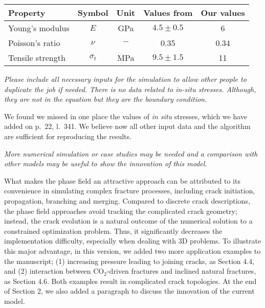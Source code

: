 \documentclass{elsarticle}
\newcommand{\review}[1]{ \textit{#1}}
\begin{document}
{\begin{table}[htbp]
	\begin{tabular}{l c c c c}
		\hline 
		Property & Symbol & Unit & Values from \cite{eseme2007review} & Our values\\
		\hline
		Young's modulus & $E$ & GPa & $4.5\pm0.5$ & 6\\
		Poisson's ratio & $\nu$ & $-$ & 0.35 & 0.34\\
		Tensile strength & $\sigma_t$ & MPa & $9.5\pm1.5$ & 11\\
		\hline
	\end{tabular}
	\label{Tab:input_data}
\end{table}


    \review{Please include all necessary inputs for the simulation to allow other people to duplicate the job if needed.
    There is no data related to in-situ stresses. Although, they are not in the equation but they are the boundary condition.}

{We found we missed in one place the values of \textit{in situ} stresses, which we have added on p.~22, l.~341. We believe now all other input data and the algorithm are sufficient for reproducing the results.}

\bigskip

    \review{More numerical simulation or case studies may be needed and a comparison with other models may be useful to show the innovation of this model.}

{What makes the phase field an attractive approach can be attributed to its convenience in simulating complex fracture processes, including crack initiation, propagation, branching and merging. Compared to discrete crack descriptions, the phase field approaches avoid tracking the complicated crack geometry; instead, the crack evolution is a natural outcome of the numerical solution to a constrained optimization problem. Thus, it significantly decreases the implementation difficulty, especially when dealing with 3D problems. To illustrate this major advantage, in this version, we added two more application examples to the manuscript; (1) increasing pressure leading to joining cracks, as Section 4.4, and (2) interaction between CO$_2$-driven fractures and inclined natural fractures, as Section 4.6. Both examples result in complicated crack topologies. At the end of Section 2, we also added a paragraph to discuss the innovation of the current model.}

}
\end{document}
